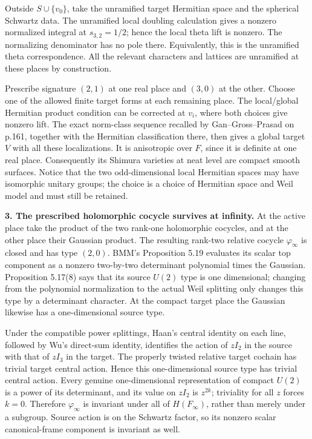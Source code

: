 \documentclass[11pt,a4paper]{article}
\theoremstyle{definition}
\begin{document}
Outside \(S\cup\{v_0\}\), take the unramified target Hermitian space and the spherical Schwartz data. The unramified local doubling calculation gives a nonzero normalized integral at \(s_{3,2}=1/2\); hence the local theta lift is nonzero. The normalizing denominator has no pole there. Equivalently, this is the unramified theta correspondence. All the relevant characters and lattices are unramified at these places by construction.

Prescribe signature \((2,1)\) at one real place and \((3,0)\) at the other. Choose one of the allowed finite target forms at each remaining place. The local/global Hermitian product condition can be corrected at \(v_i\), where both choices give nonzero lift. The exact norm-class sequence recalled by Gan--Gross--Prasad on p.161, together with the Hermitian classification there, then gives a global target \(V\) with all these localizations. It is anisotropic over \(F\), since it is definite at one real place. Consequently its Shimura varieties at neat level are compact smooth surfaces. Notice that the two odd-dimensional local Hermitian spaces may have isomorphic unitary groups; the choice is a choice of Hermitian space and Weil model and must still be retained.

\textbf{3. The prescribed holomorphic cocycle survives at infinity.} At the active place take the product of the two rank-one holomorphic cocycles, and at the other place their Gaussian product. The resulting rank-two relative cocycle \(\varphi_\infty\) is closed and has type \((2,0)\). BMM's Proposition 5.19 evaluates its scalar top component as a nonzero two-by-two determinant polynomial times the Gaussian. Proposition 5.17(8) says that its source \(U(2)\) type is one dimensional; changing from the polynomial normalization to the actual Weil splitting only changes this type by a determinant character. At the compact target place the Gaussian likewise has a one-dimensional source type.

Under the compatible power splittings, Haan's central identity on each line, followed by Wu's direct-sum identity, identifies the action of \(zI_2\) in the source with that of \(zI_3\) in the target. The properly twisted relative target cochain has trivial target central action. Hence this one-dimensional source type has trivial central action. Every genuine one-dimensional representation of compact \(U(2)\) is a power of its determinant, and its value on \(zI_2\) is \(z^{2k}\); triviality for all \(z\) forces \(k=0\). Therefore \(\varphi_\infty\) is invariant under all of \(H(F_\infty)\), rather than merely under a subgroup. Source action is on the Schwartz factor, so its nonzero scalar canonical-frame component is invariant as well.
\end{document}
